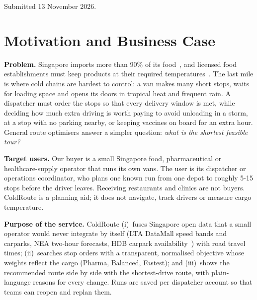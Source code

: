 \documentclass[10.5pt,a4paper]{article}
\newif\ifdraftnotes
\newcounter{draftnote}
\begin{document}
\begin{titlepage}
\vspace{0.5cm}
\begin{minipage}{0.75\linewidth}
\small
\renewcommand{\contentsname}{\normalsize Contents}
\setcounter{tocdepth}{1}
\tableofcontents
\end{minipage}
\vfill
{\footnotesize Submitted 13 November 2026.\ifdraftnotes\ \textcolor{red}{DRAFT v1, 4 Nov 2026: coloured boxes are team notes and disappear in \texttt{final.tex}.}\fi\par}
\end{titlepage}

\section{Motivation and Business Case}
\textbf{Problem.} Singapore imports more than 90\% of its food~\cite{sfa}, and licensed food establishments must keep
products at their required temperatures~\cite{sfaresp}. The last mile is where cold chains are hardest to control: a van
makes many short stops, waits for loading space and opens its doors in tropical heat and frequent rain. A dispatcher must
order the stops so that every delivery window is met, while deciding how much extra driving is worth paying to avoid
unloading in a storm, at a stop with no parking nearby, or keeping vaccines on board for an extra hour. General route
optimisers answer a simpler question: \emph{what is the shortest feasible tour?}

\textbf{Target users.} Our buyer is a small Singapore food, pharmaceutical or healthcare-supply operator that runs its own
vans. The user is its dispatcher or operations coordinator, who plans one known run from one depot to roughly 5-15 stops
before the driver leaves. Receiving restaurants and clinics are not buyers. ColdRoute is a planning aid; it does not
navigate, track drivers or measure cargo temperature.

\textbf{Purpose of the service.} ColdRoute (i)~fuses Singapore open data that a small operator would never integrate by
itself (LTA DataMall speed bands and carparks, NEA two-hour forecasts, HDB carpark availability~\cite{lta,datagov}) with
road travel times; (ii)~searches stop orders with a transparent, normalised objective whose weights reflect the cargo
(Pharma, Balanced, Fastest); and (iii)~shows the recommended route side by side with the shortest-drive route, with
plain-language reasons for every change. Runs are saved per dispatcher account so that teams can reopen and replan them.
\end{document}
